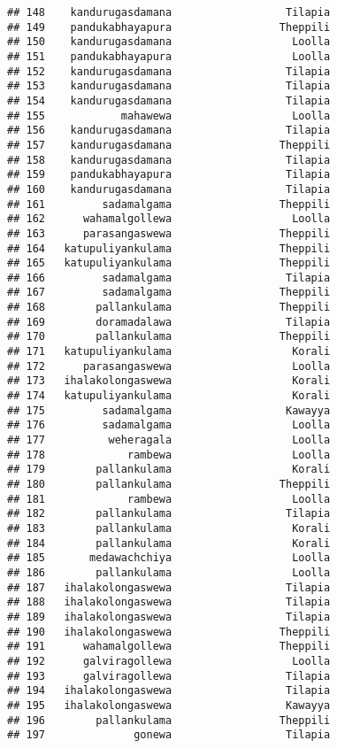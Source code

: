 \documentclass[
]{article}
\begin{document}
\begin{verbatim}
## 148    kandurugasdamana                  Tilapia 
## 149    pandukabhayapura                 Theppili 
## 150    kandurugasdamana                   Loolla 
## 151    pandukabhayapura                   Loolla 
## 152    kandurugasdamana                  Tilapia 
## 153    kandurugasdamana                  Tilapia 
## 154    kandurugasdamana                  Tilapia 
## 155            mahawewa                   Loolla 
## 156    kandurugasdamana                  Tilapia 
## 157    kandurugasdamana                 Theppili 
## 158    kandurugasdamana                  Tilapia 
## 159    pandukabhayapura                  Tilapia 
## 160    kandurugasdamana                  Tilapia 
## 161         sadamalgama                 Theppili 
## 162      wahamalgollewa                   Loolla 
## 163      parasangaswewa                 Theppili 
## 164   katupuliyankulama                 Theppili 
## 165   katupuliyankulama                 Theppili 
## 166         sadamalgama                  Tilapia 
## 167         sadamalgama                 Theppili 
## 168        pallankulama                 Theppili 
## 169        doramadalawa                  Tilapia 
## 170        pallankulama                 Theppili 
## 171   katupuliyankulama                   Korali 
## 172      parasangaswewa                   Loolla 
## 173   ihalakolongaswewa                   Korali 
## 174   katupuliyankulama                   Korali 
## 175         sadamalgama                  Kawayya 
## 176         sadamalgama                   Loolla 
## 177          weheragala                   Loolla 
## 178             rambewa                   Loolla 
## 179        pallankulama                   Korali 
## 180        pallankulama                 Theppili 
## 181             rambewa                   Loolla 
## 182        pallankulama                  Tilapia 
## 183        pallankulama                   Korali 
## 184        pallankulama                   Korali 
## 185       medawachchiya                   Loolla 
## 186        pallankulama                   Loolla 
## 187   ihalakolongaswewa                  Tilapia 
## 188   ihalakolongaswewa                  Tilapia 
## 189   ihalakolongaswewa                  Tilapia 
## 190   ihalakolongaswewa                 Theppili 
## 191      wahamalgollewa                 Theppili 
## 192      galviragollewa                   Loolla 
## 193      galviragollewa                  Tilapia 
## 194   ihalakolongaswewa                  Tilapia 
## 195   ihalakolongaswewa                  Kawayya 
## 196        pallankulama                 Theppili 
## 197              gonewa                  Tilapia 

\end{verbatim}
\end{document}
